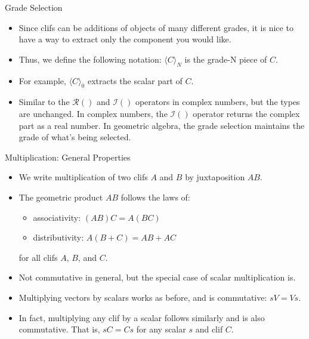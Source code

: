 \documentclass[aspectratio=169,xcolor=dvipsnames]{beamer}
\begin{document}

\begin{frame}{Grade Selection}

\begin{itemize}
      \item Since clifs can be additions of objects of many different grades,
            it is nice to have a way to extract only the component you would like.
      \item Thus, we define the following notation: $\langle C \rangle_N$ is the
            grade-N piece of $C$.
      \item For example, $\langle C \rangle_0$ extracts the scalar part of $C$.
      \item Similar to the $\mathcal{R}()$ and $\mathcal{I}()$ operators in complex numbers,
            but the types are unchanged. In complex numbers, the $\mathcal{I}()$ operator
            returns the complex part as a real number. In geometric algebra, the
            grade selection maintains the grade of what's being selected.
\end{itemize}
\end{frame}
      

\begin{frame}{Multiplication: General Properties}

\begin{itemize}
      \item We write multiplication of two clifs $A$ and $B$ by juxtaposition $AB$.
      \item The geometric product $AB$ follows the laws of:
            \begin{itemize}
                  \item associativity: $(AB)C = A(BC)$
                  \item distributivity: $A(B+C) = AB + AC$
            \end{itemize}
            for all clifs $A$, $B$, and $C$.
      \item Not commutative in general, but the special case of scalar multiplication is.
      \item Multiplying vectors by scalars works as before, and is commutative: $sV = Vs$.
      \item In fact, multiplying any clif by a scalar follows similarly and is also
            commutative. That is, $sC = Cs$ for any scalar $s$ and clif $C$.
\end{itemize}
\end{frame}
      
\end{document}
